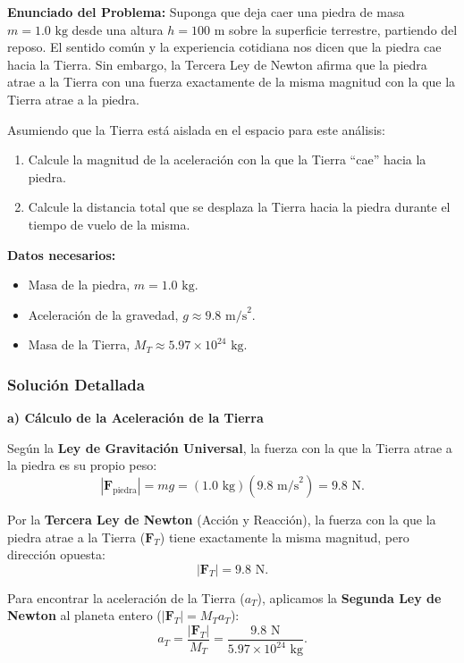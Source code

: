 \documentclass[11pt,a4paper]{book}
\begin{document}
\textbf{Enunciado del Problema:} 
Suponga que deja caer una piedra de masa $m = 1.0 \text{ kg}$ desde una altura $h = 100 \text{ m}$ sobre la superficie terrestre, partiendo del reposo. El sentido común y la experiencia cotidiana nos dicen que la piedra cae hacia la Tierra. Sin embargo, la Tercera Ley de Newton afirma que la piedra atrae a la Tierra con una fuerza exactamente de la misma magnitud con la que la Tierra atrae a la piedra.

Asumiendo que la Tierra está aislada en el espacio para este análisis:
\begin{enumerate}
    \item[a)] Calcule la magnitud de la aceleración con la que la Tierra ``cae'' hacia la piedra.
    \item[b)] Calcule la distancia total que se desplaza la Tierra hacia la piedra durante el tiempo de vuelo de la misma.
\end{enumerate}

\textbf{Datos necesarios:}
\begin{itemize}
    \item Masa de la piedra, $m = 1.0 \text{ kg}$.
    \item Aceleración de la gravedad, $g \approx 9.8 \text{ m/s}^2$.
    \item Masa de la Tierra, $M_T \approx 5.97 \times 10^{24} \text{ kg}$.
\end{itemize}

\subsubsection*{Solución Detallada}

\textbf{a) Cálculo de la Aceleración de la Tierra}

Según la \textbf{Ley de Gravitación Universal}, la fuerza con la que la Tierra atrae a la piedra es su propio peso:
\begin{equation}
    |\boldsymbol{F}_{\text{piedra}}| = mg = (1.0 \text{ kg})(9.8 \text{ m/s}^2) = 9.8 \text{ N}.
\end{equation}

Por la \textbf{Tercera Ley de Newton} (Acción y Reacción), la fuerza con la que la piedra atrae a la Tierra ($\boldsymbol{F}_T$) tiene exactamente la misma magnitud, pero dirección opuesta:
\begin{equation}
    |\boldsymbol{F}_T| = 9.8 \text{ N}.
\end{equation}

Para encontrar la aceleración de la Tierra ($a_T$), aplicamos la \textbf{Segunda Ley de Newton} al planeta entero ($|\boldsymbol{F}_T| = M_T a_T$):
\begin{equation}
    a_T = \frac{|\boldsymbol{F}_T|}{M_T} = \frac{9.8 \text{ N}}{5.97 \times 10^{24} \text{ kg}}.
\end{equation}
\end{document}
